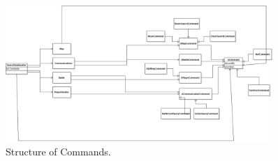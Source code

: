 \begin{figure}[]
\center
\includegraphics[width=0.9\textwidth] {diagrams/CommandStructureDiagram.png}
\caption{Structure of Commands.}
\label{commandstructure}
\end{figure}


